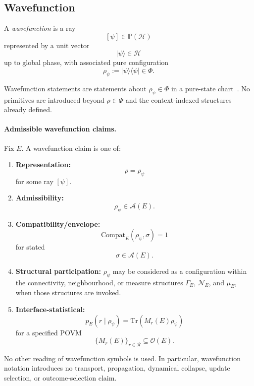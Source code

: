 \documentclass[aps,prx,onecolumn,11pt]{revtex4-2}
\theoremstyle{plain}
\theoremstyle{definition}
\theoremstyle{remark}
\begin{document}
\subsection{Wavefunction}
\label{subsec:wavefunction}

A \emph{wavefunction} is a ray
\[
[\psi]\in\mathbb P(\mathcal H)
\]
represented by a unit vector
\[
|\psi\rangle\in\mathcal H
\]
up to global phase, with associated pure configuration
\[
\rho_\psi
:=
|\psi\rangle\langle\psi|
\in
\Phi.
\]

Wavefunction statements are statements about
\(\rho_\psi\in\Phi\) in a pure-state chart~\cite{NielsenChuang2010,Watrous2018}.
No primitives are introduced beyond \(\rho\in\Phi\) and the
context-indexed structures already defined.

\paragraph{Admissible wavefunction claims.}

Fix \(E\). A wavefunction claim is one of:

\begin{enumerate}[label=(\roman*), leftmargin=2.2em]

\item \textbf{Representation:}
\[
\rho=\rho_\psi
\]
for some ray \([\psi]\).

\item \textbf{Admissibility:}
\[
\rho_\psi\in\mathcal A(E).
\]

\item \textbf{Compatibility/envelope:}
\[
\mathrm{Compat}_E(\rho_\psi,\sigma)=1
\]
for stated
\[
\sigma\in\mathcal A(E).
\]

\item \textbf{Structural participation:}
\(\rho_\psi\) may be considered as a configuration within the
connectivity, neighbourhood, or measure structures
\(\Gamma_E\), \(\mathcal N_E\), and \(\mu_E\), when those structures
are invoked.

\item \textbf{Interface-statistical:}
\[
p_E(r\mid\rho_\psi)
=
\mathrm{Tr}(M_r(E)\rho_\psi)
\]
for a specified POVM
\[
\{M_r(E)\}_{r\in\mathcal R}
\subseteq
\mathcal O(E).
\]

\end{enumerate}

No other reading of wavefunction symbols is used. In particular,
wavefunction notation introduces no transport, propagation, dynamical
collapse, update selection, or outcome-selection claim.
\end{document}
